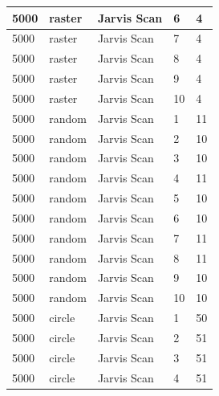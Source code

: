 \documentclass[12pt]{article}
\begin{document}
\begin{longtable}{|l|l|l|l|l|}
5000         & raster            & Jarvis Scan & 6          & 4                             \\ \hline
5000         & raster            & Jarvis Scan & 7          & 4                             \\ \hline
5000         & raster            & Jarvis Scan & 8          & 4                             \\ \hline
5000         & raster            & Jarvis Scan & 9          & 4                             \\ \hline
5000         & raster            & Jarvis Scan & 10         & 4                             \\ \hline
5000         & random            & Jarvis Scan & 1          & 11                            \\ \hline
5000         & random            & Jarvis Scan & 2          & 10                            \\ \hline
5000         & random            & Jarvis Scan & 3          & 10                            \\ \hline
5000         & random            & Jarvis Scan & 4          & 11                            \\ \hline
5000         & random            & Jarvis Scan & 5          & 10                            \\ \hline
5000         & random            & Jarvis Scan & 6          & 10                            \\ \hline
5000         & random            & Jarvis Scan & 7          & 11                            \\ \hline
5000         & random            & Jarvis Scan & 8          & 11                            \\ \hline
5000         & random            & Jarvis Scan & 9          & 10                            \\ \hline
5000         & random            & Jarvis Scan & 10         & 10                            \\ \hline
5000         & circle            & Jarvis Scan & 1          & 50                            \\ \hline
5000         & circle            & Jarvis Scan & 2          & 51                            \\ \hline
5000         & circle            & Jarvis Scan & 3          & 51                            \\ \hline
5000         & circle            & Jarvis Scan & 4          & 51                            \\ \hline

\end{longtable}
\end{document}
